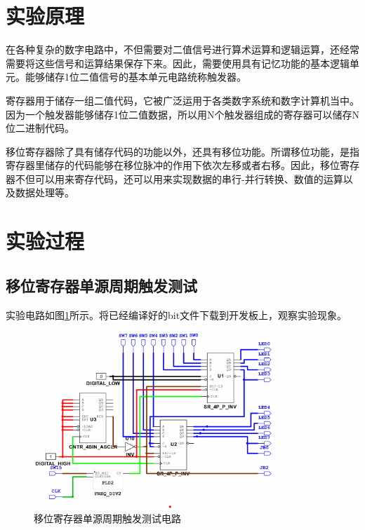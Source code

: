 \documentclass[UTF8]{ctexart}
\numberwithin{figure}{subsection}
\numberwithin{table}{subsection}
\numberwithin{equation}{subsection}
\begin{document}
\section{实验原理}
\par 在各种复杂的数字电路中，不但需要对二值信号进行算术运算和逻辑运算，还经常需要将这些信号和运算结果保存下来。因此，需要使用具有记忆功能的基本逻辑单元。能够储存1位二值信号的基本单元电路统称触发器。
\par 寄存器用于储存一组二值代码，它被广泛运用于各类数字系统和数字计算机当中。因为一个触发器能够储存1位二值数据，所以用N个触发器组成的寄存器可以储存N位二进制代码。
\par 移位寄存器除了具有储存代码的功能以外，还具有移位功能。所谓移位功能，是指寄存器里储存的代码能够在移位脉冲的作用下依次左移或者右移。因此，移位寄存器不但可以用来寄存代码，还可以用来实现数据的串行-并行转换、数值的运算以及数据处理等。

\section{实验过程}
\subsection{移位寄存器单源周期触发测试}
\par 实验电路如图\ref{single source citcuit}所示。将已经编译好的bit文件下载到开发板上，观察实验现象。

\begin{figure}[H]
    \begin{center}
        \includegraphics[width=0.8\textwidth]{pics/1S-V2/circuit.jpg}
    \end{center}
    \caption{移位寄存器单源周期触发测试电路}
    \label{single source citcuit}
\end{figure}
\end{document}
